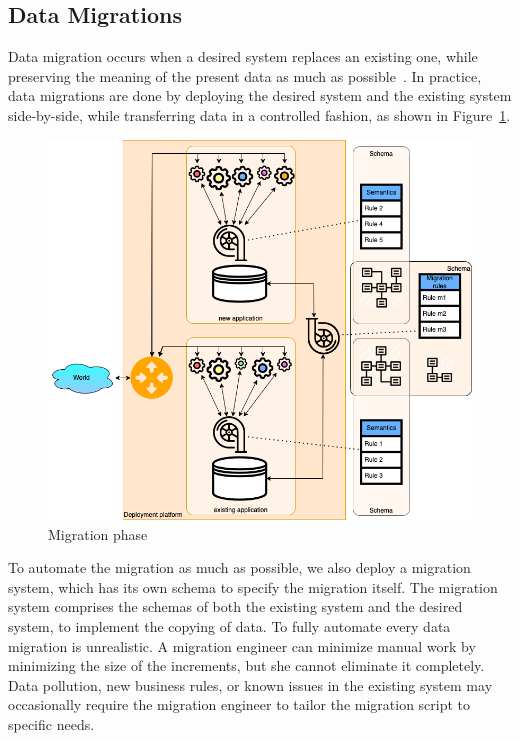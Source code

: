 \documentclass[runningheads]{llncs}
\begin{document}
\subsection{Data Migrations}
   Data migration occurs when a desired system replaces an existing one,
   while preserving the meaning of the present data as much as possible~\cite{Spivak2012}.
   In practice, data migrations are done by deploying the desired system and the existing system side-by-side,
   while transferring data in a controlled fashion, as shown in Figure~\ref{fig:migration phase}.
\begin{figure}[bht]
   \begin{center}
     \includegraphics[scale=.35]{figures/datamigration-Migration-phase.png}
   \end{center}
\caption{Migration phase}
\label{fig:migration phase}
\end{figure}
   To automate the migration as much as possible,
   we also deploy a migration system,
   which has its own schema to specify the migration itself.
   The migration system comprises the schemas of both the existing system and the desired system,
   to implement the copying of data.
   To fully automate every data migration is unrealistic.
   A migration engineer can minimize manual work by minimizing the size of the increments,
   but she cannot eliminate it completely.
   Data pollution, new business rules, or known issues in the existing system
   may occasionally require the migration engineer to tailor the migration script to specific needs.
\end{document}
